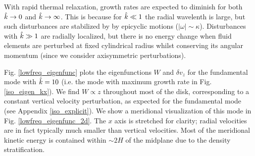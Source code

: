 With rapid thermal relaxation, growth rates are expected to diminish
for both $\hat{k}\to 0$ and $\hat{k}\to \infty$. This is because for
$\hat{k}\ll 1$ the radial wavelenth is large, but such disturbances are 
stabilized by by epicyclic motions ($|\omega|\sim
\kappa$). Disturbances with $\hat{k}\gg 1$ are radially localized, but  
there is no energy change when fluid elements are perturbed at fixed
cylindrical radius whilst conserving its angular momentum (since we
consider axisymmetric perturbations).  
 
Fig. \ref{lowfreq_eigenfunc} plots the eigenfunctions $W$ and $\delta 
v_z$ for the fundamental mode with $\hat{k}=10$ (i.e. the mode with
maximum growth rate in Fig. \ref{iso_eigen_kx}). We find $W\propto z$
throughout most of the disk, corresponding to a constant vertical
velocity perturbation, as expected for the fundamental mode (see
Appendix \ref{iso_explicit}). We show a meridional visualization of
this mode in Fig. \ref{lowfreq_eigenfunc_2d}. The $x$ axis is
stretched for clarity; radial velocities are in fact typically much 
smaller than vertical velocities. Most of the meridional kinetic energy is
contained within $\sim 2H$ of the midplane due to the density 
stratification. 

